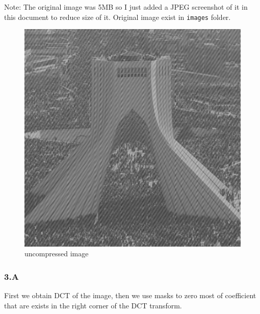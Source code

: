 \documentclass[11pt]{article}
\makeatletter
\def\maxwidth{\ifdim\Gin@nat@width>\linewidth\linewidth
    \else\Gin@nat@width\fi}
\let\Oldincludegraphics\includegraphics
\renewcommand{\includegraphics}[1]{\Oldincludegraphics[width=.8\maxwidth]{#1}}
\makeatother
\begin{document}
Note: The original image was 5MB so I just added a JPEG screenshot of it
in this document to reduce size of it. Original image exist in
\texttt{images} folder.

\begin{figure}
\centering
\includegraphics{wiki/compression.jpg}
\caption{uncompressed image}
\end{figure}

    \hypertarget{a}{%
\subsubsection{3.A}\label{a}}

First we obtain DCT of the image, then we use masks to zero most of
coefficient that are exists in the right corner of the DCT transform.
\end{document}
